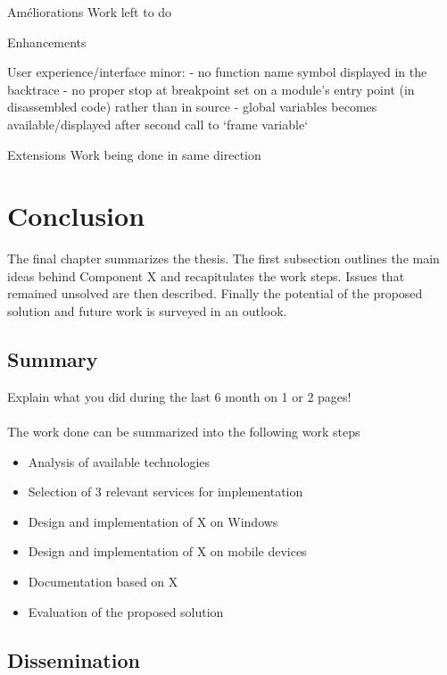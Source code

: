 Améliorations
Work left to do

Enhancements

User experience/interface minor:
- no function name symbol displayed in the backtrace
- no proper stop at breakpoint set on a module's entry point (in disassembled code) rather than in source
- global variables becomes available/displayed after second call to `frame variable`

Extensions
Work being done in same direction

\chapter{Conclusion\label{cha:chapter7}}
The final chapter summarizes the thesis. The first subsection outlines the main ideas behind Component X and recapitulates the work steps. Issues that remained unsolved are then described. Finally the potential of the proposed solution and future work is surveyed in an outlook.

\section{Summary\label{sec:summary}}

Explain what you did during the last 6 month on 1 or 2 pages!
\\
\\
\noindent The work done can be summarized into the following work steps

\begin{itemize}
		\item Analysis of available technologies
		\vspace{-0.11in}
		\item Selection of 3 relevant services for implementation
		\vspace{-0.11in}
		\item Design and implementation of X on Windows
		\vspace{-0.11in}
		\item Design and implementation of X on mobile devices
		\vspace{-0.11in}
		\item Documentation based on X
		\vspace{-0.11in}
		\item Evaluation of the proposed solution
\end{itemize}

\section{Dissemination\label{sec:dissemination}}

